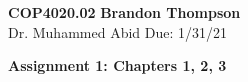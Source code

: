 \noindent
\textbf{COP4020.02} \hfill \textbf{Brandon Thompson} \\
\normalsize Dr. Muhammed Abid \hfill Due: 1/31/21\\

\begin{center}
\textbf{Assignment 1: Chapters 1, 2, 3}
\end{center}